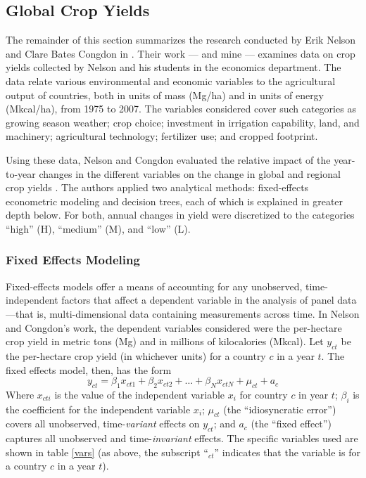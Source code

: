 \documentclass[11pt]{article}
\begin{document}
\subsection{Global Crop Yields}

The remainder of this section summarizes the research conducted by Erik Nelson and Clare Bates Congdon in \cite{nelson_measuring_2016}. Their work --- and mine --- examines data on crop yields collected by Nelson and his students in the economics department. The data relate various environmental and economic variables to the agricultural output of countries, both in units of mass (Mg/ha) and in units of energy (Mkcal/ha), from 1975 to 2007. The variables considered cover such categories as growing season weather; crop choice; investment in irrigation capability, land, and machinery; agricultural technology; fertilizer use; and cropped footprint. 

Using these data, Nelson and Congdon evaluated the relative impact of the year-to-year changes in the different variables on the change in global and regional crop yields \cite{nelson_measuring_2016}. The authors applied two analytical methods: fixed-effects econometric modeling and decision trees, each of which is explained in greater depth below. For both, annual changes in yield were discretized to the categories ``high'' (H), ``medium'' (M), and ``low'' (L). 


\subsubsection{Fixed Effects Modeling}

Fixed-effects models offer a means of accounting for any unobserved, time-independent factors that affect a dependent variable in the analysis of panel data---that is, multi-dimensional data containing measurements across time. In Nelson and Congdon's work, the dependent variables considered were the per-hectare crop yield in metric tons (Mg) and in millions of kilocalories (Mkcal). Let $y_{ct}$ be the per-hectare crop yield (in whichever units) for a country $c$ in a year $t$. The fixed effects model, then, has the form
$$y_{ct} = \beta_1x_{ct1} + \beta_2x_{ct2} + \ldots + \beta_Nx_{ctN} + \mu_{ct} + a_c$$
Where $x_{cti}$ is the value of the independent variable $x_i$ for country $c$ in year $t$; $\beta_i$ is the coefficient for the independent variable $x_i$; $\mu_{ct}$ (the ``idiosyncratic error'') covers all unobserved, time-\emph{variant} effects  on $y_{ct}$; and $a_c$ (the ``fixed effect'') captures all unobserved and time-\emph{invariant} effects.
The specific variables used are shown in table \ref{vars} (as above, the subscript ``$_{ct}$'' indicates that the variable is for a country $c$ in a year $t$).
\end{document}
